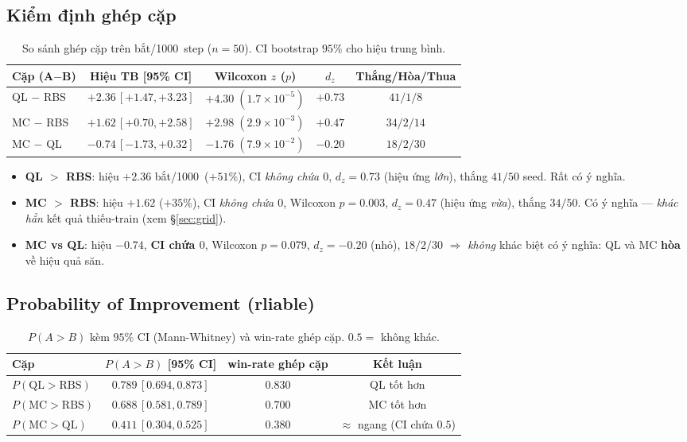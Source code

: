 \documentclass[11pt,a4paper]{article}
\newcommand{\catk}{bắt/1000}
\begin{document}
\subsection{Kiểm định ghép cặp}

\begin{table}[h]
\centering
\caption{So sánh ghép cặp trên \catk\ step ($n=50$). CI bootstrap $95\%$ cho hiệu trung bình.}
\label{tab:paired}
\small
\begin{tabular}{lcccc}
\toprule
Cặp (A$-$B) & Hiệu TB [95\% CI] & Wilcoxon $z$ ($p$) & $d_z$ & Thắng/Hòa/Thua \\
\midrule
QL $-$ RBS & $+2.36\,[+1.47,+3.23]$ & $+4.30\;(1.7\!\times\!10^{-5})$ & $+0.73$ & $41/1/8$ \\
MC $-$ RBS & $+1.62\,[+0.70,+2.58]$ & $+2.98\;(2.9\!\times\!10^{-3})$ & $+0.47$ & $34/2/14$ \\
MC $-$ QL  & $-0.74\,[-1.73,+0.32]$ & $-1.76\;(7.9\!\times\!10^{-2})$ & $-0.20$ & $18/2/30$ \\
\bottomrule
\end{tabular}
\end{table}

\begin{itemize}[leftmargin=1.4em,itemsep=1pt]
  \item \textbf{QL $>$ RBS}: hiệu $+2.36$ \catk\ ($+51\%$), CI \emph{không chứa $0$}, $d_z=0.73$
        (hiệu ứng \emph{lớn}), thắng $41/50$ seed. Rất có ý nghĩa.
  \item \textbf{MC $>$ RBS}: hiệu $+1.62$ ($+35\%$), CI \emph{không chứa $0$}, Wilcoxon $p=0.003$,
        $d_z=0.47$ (hiệu ứng \emph{vừa}), thắng $34/50$. Có ý nghĩa --- \emph{khác hẳn} kết quả
        thiếu-train (xem \S\ref{sec:grid}).
  \item \textbf{MC vs QL}: hiệu $-0.74$, \textbf{CI chứa $0$}, Wilcoxon $p=0.079$, $d_z=-0.20$ (nhỏ),
        $18/2/30$ $\Rightarrow$ \emph{không} khác biệt có ý nghĩa: QL và MC \textbf{hòa} về hiệu quả săn.
\end{itemize}

\subsection{Probability of Improvement (rliable)}

\begin{table}[h]
\centering
\caption{$P(A>B)$ kèm $95\%$ CI (Mann-Whitney) và win-rate ghép cặp. $0.5 =$ không khác.}
\label{tab:poi}
\small
\begin{tabular}{lccc}
\toprule
Cặp & $P(A>B)$ [95\% CI] & win-rate ghép cặp & Kết luận \\
\midrule
$P(\text{QL}>\text{RBS})$ & $0.789\,[0.694,0.873]$ & $0.830$ & QL tốt hơn \\
$P(\text{MC}>\text{RBS})$ & $0.688\,[0.581,0.789]$ & $0.700$ & MC tốt hơn \\
$P(\text{MC}>\text{QL})$  & $0.411\,[0.304,0.525]$ & $0.380$ & $\approx$ ngang (CI chứa $0.5$) \\
\bottomrule
\end{tabular}
\end{table}
\end{document}
